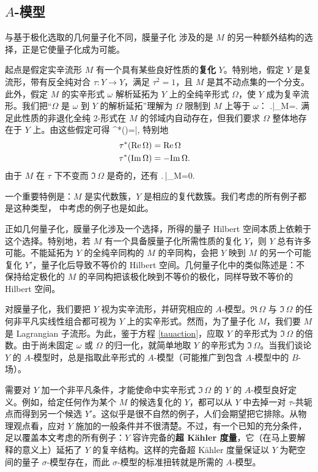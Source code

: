 \subsection{$A$-模型}\label{amo}

与基于极化选取的几何量子化不同，膜量子化 \cite{GW} 涉及的是 $M$ 的另一种额外结构的选择，正是它使量子化成为可能。

起点是假定实辛流形 $M$ 有一个具有某些良好性质的\textbf{复化} $Y$。特别地，假定 $Y$ 是复流形，带有反全纯对合 $\tau:Y\to Y$，满足 $\tau^2=1$，且 $M$ 是其不动点集的一个分支。此外，假定 $M$ 的实辛形式 $\omega$ 解析延拓为 $Y$ 上的全纯辛形式 $\Omega$，使 $Y$ 成为复辛流形。我们把“$\Omega$ 是 $\omega$ 到 $Y$ 的解析延拓”理解为 $\Omega$ 限制到 $M$ 上等于 $\omega$：
\be\label{circo}\left.\Omega\right|_M=\omega. \ee
满足此性质的非退化全纯 2-形式在 $M$ 的邻域内自动存在，但我们要求 $\Omega$ 整体地存在于 $Y$ 上。由这些假定可得
\be\label{taupl}\tau^*(\Omega)=\bar\Omega,\ee
特别地
\begin{align}\label{tauaction} \tau^*(\Re\,\Omega)&=\Re\,\Omega \cr \tau^*(\Im\,\Omega)&=-\Im\,\Omega. \end{align}
由于 $M$ 在 $\tau$ 下不变而 $\Im\,\Omega$ 是奇的，还有
\be\label{lagm} \left.\Im\,\Omega\right|_M=0. \ee

一个重要特例是：$M$ 是实代数簇，$Y$ 是相应的复代数簇。我们考虑的所有例子都是这种类型，\cite{GW} 中考虑的例子也是如此。

正如几何量子化，膜量子化涉及一个选择，所得的量子 Hilbert 空间本质上依赖于这个选择。特别地，若 $M$ 有一个具备膜量子化所需性质的复化 $Y$，则 $Y$ 总有许多可能。不能延拓为 $Y$ 的全纯辛同构的 $M$ 的辛同构，会把 $Y$ 映到 $M$ 的另一个可能复化 $Y'$，量子化后导致不等价的 Hilbert 空间。几何量子化中的类似陈述是：不保持给定极化的 $M$ 的辛同构把该极化映到不等价的极化，同样导致不等价的 Hilbert 空间。

对膜量子化，我们要把 $Y$ 视为实辛流形，并研究相应的 $A$-模型。$\Re\,\Omega$ 与 $\Im\,\Omega$ 的任何非平凡实线性组合都可视为 $Y$ 上的实辛形式。然而，为了量子化 $M$，我们要 $M$ 是 Lagrangian 子流形。为此，鉴于方程 \eqref{tauaction}，应取 $Y$ 的辛形式为 $\Im\,\Omega$ 的倍数。由于尚未固定 $\omega$ 或 $\Omega$ 的归一化，就简单地取 $Y$ 的辛形式为 $\Im\,\Omega$。当我们谈论 $Y$ 的 $A$-模型时，总是指取此辛形式的 $A$-模型（可能推广到包含 $A$-模型中的 $B$-场）。

需要对 $Y$ 加一个非平凡条件，才能使命中实辛形式 $\Im\,\Omega$ 的 $Y$ 的 $A$-模型良好定义。例如，给定任何作为某个 $M$ 的候选复化的 $Y$，都可以从 $Y$ 中去掉一对 $\tau$-共轭点而得到另一个候选 $Y'$。这似乎是很不自然的例子，人们会期望把它排除。从物理观点看，应对 $Y$ 施加的一般条件并不很清楚。不过，有一个已知的充分条件，足以覆盖本文考虑的所有例子：$Y$ 容许完备的\textbf{超 Kähler 度量}，它（在马上要解释的意义上）延拓了 $Y$ 的复辛结构。这样的完备超 Kähler 度量保证以 $Y$ 为靶空间的量子 $\sigma$-模型存在，而此 $\sigma$-模型的标准扭转就是所需的 $A$-模型。

